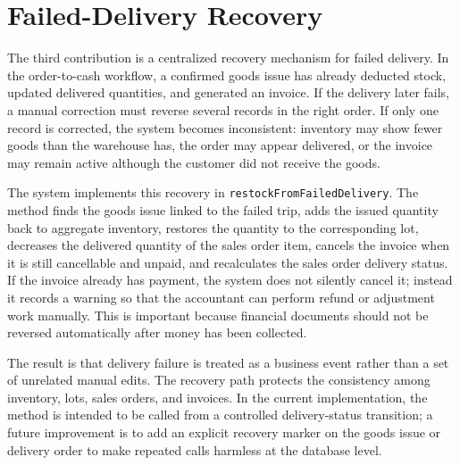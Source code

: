 \section{Failed-Delivery Recovery}
The third contribution is a centralized recovery mechanism for failed delivery.
In the order-to-cash workflow, a confirmed goods issue has already deducted
stock, updated delivered quantities, and generated an invoice. If the delivery
later fails, a manual correction must reverse several records in the right order.
If only one record is corrected, the system becomes inconsistent: inventory may
show fewer goods than the warehouse has, the order may appear delivered, or the
invoice may remain active although the customer did not receive the goods.

The system implements this recovery in \texttt{restockFromFailedDelivery}. The
method finds the goods issue linked to the failed trip, adds the issued quantity
back to aggregate inventory, restores the quantity to the corresponding lot,
decreases the delivered quantity of the sales order item, cancels the invoice
when it is still cancellable and unpaid, and recalculates the sales order
delivery status. If the invoice already has payment, the system does not
silently cancel it; instead it records a warning so that the accountant can
perform refund or adjustment work manually. This is important because financial
documents should not be reversed automatically after money has been collected.

The result is that delivery failure is treated as a business event rather than a
set of unrelated manual edits. The recovery path protects the consistency among
inventory, lots, sales orders, and invoices. In the current implementation, the
method is intended to be called from a controlled delivery-status transition; a
future improvement is to add an explicit recovery marker on the goods issue or
delivery order to make repeated calls harmless at the database level.

